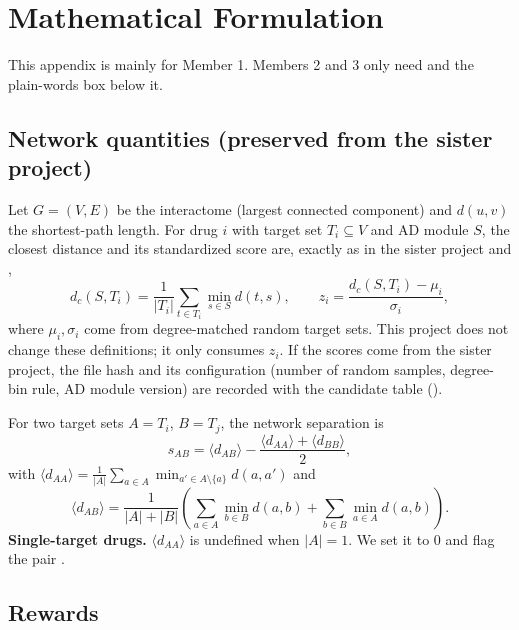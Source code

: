 \section{Mathematical Formulation}
\label{app:formulation}

This appendix is mainly for Member 1. Members 2 and 3 only need  and the plain-words box below it.

\subsection{Network quantities (preserved from the sister project)}

Let $G=(V,E)$ be the interactome (largest connected component) and $d(u,v)$ the shortest-path length. For drug $i$ with target set $T_i\subseteq V$ and AD module $S$, the closest distance and its standardized score are, exactly as in the sister project and \cite{guney2016network},
\begin{equation}
d_c(S,T_i)=\frac{1}{|T_i|}\sum_{t\in T_i}\min_{s\in S} d(t,s), \qquad z_i=\frac{d_c(S,T_i)-\mu_i}{\sigma_i},
\end{equation}
where $\mu_i,\sigma_i$ come from degree-matched random target sets. This project does not change these definitions; it only consumes $z_i$. If the scores come from the sister project, the file hash and its configuration (number of random samples, degree-bin rule, AD module version) are recorded with the candidate table ().

For two target sets $A=T_i$, $B=T_j$, the network separation is \cite{menche2015uncovering,cheng2019combinations}
\begin{equation}
s_{AB}=\langle d_{AB}\rangle-\frac{\langle d_{AA}\rangle+\langle d_{BB}\rangle}{2},
\end{equation}
with $\langle d_{AA}\rangle=\frac{1}{|A|}\sum_{a\in A}\min_{a'\in A\setminus\{a\}} d(a,a')$ and
\begin{equation}
\langle d_{AB}\rangle=\frac{1}{|A|+|B|}\left(\sum_{a\in A}\min_{b\in B}d(a,b)+\sum_{b\in B}\min_{a\in A}d(a,b)\right).
\end{equation}
\textbf{Single-target drugs.} $\langle d_{AA}\rangle$ is undefined when $|A|=1$. We set it to $0$ and flag the pair \proposed{}. 

\subsection{Rewards}

